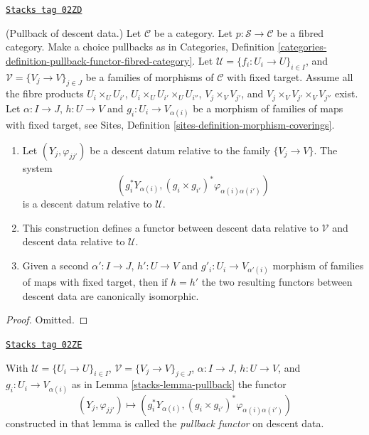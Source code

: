 \begin{lemma}[Pullback]
\label{stacks-lemma-pullback}
\href{https://stacks.math.columbia.edu/tag/02ZD}{\texttt{Stacks tag 02ZD}}

(Pullback of descent data.)
Let $\mathcal{C}$ be a category.
Let $p : \mathcal{S} \to \mathcal{C}$ be a fibred category.
Make a choice pullbacks as in Categories,
Definition \ref{categories-definition-pullback-functor-fibred-category}.
Let $\mathcal{U} = \{f_i : U_i \to U\}_{i \in I}$, and
$\mathcal{V} = \{V_j \to V\}_{j \in J}$
be a families of morphisms of $\mathcal{C}$ with fixed target.
Assume all the fibre products
$U_i \times_U U_{i'}$, $U_i \times_U U_{i'} \times_U U_{i''}$,
$V_j \times_V V_{j'}$, and $V_j \times_V V_{j'} \times_V V_{j''}$ exist.
Let $\alpha : I \to J$, $h : U \to V$ and
$g_i : U_i \to V_{\alpha(i)}$ be a morphism of families
of maps with fixed target, see
Sites, Definition \ref{sites-definition-morphism-coverings}.
\begin{enumerate}
\item Let $(Y_j, \varphi_{jj'})$ be a descent datum relative to the
family $\{V_j \to V\}$. The system
$$
\left(
g_i^*Y_{\alpha(i)},
(g_i \times g_{i'})^*\varphi_{\alpha(i)\alpha(i')}
\right)
$$
is a descent datum relative to $\mathcal{U}$.
\item This construction defines a functor between descent data relative
to $\mathcal{V}$ and descent data relative to $\mathcal{U}$.
\item Given a second $\alpha' : I \to J$, $h' : U \to V$ and
$g'_i : U_i \to V_{\alpha'(i)}$ morphism of families
of maps with fixed target, then if $h = h'$ the two resulting functors
between descent data are canonically isomorphic.
\end{enumerate}
\end{lemma}

\begin{proof}
Omitted.
\end{proof}

\begin{definition}
\label{stacks-definition-pullback-functor}
\href{https://stacks.math.columbia.edu/tag/02ZE}{\texttt{Stacks tag 02ZE}}

With $\mathcal{U} = \{U_i \to U\}_{i \in I}$,
$\mathcal{V} = \{V_j \to V\}_{j \in J}$,
$\alpha : I \to J$, $h : U \to V$,
and $g_i : U_i \to V_{\alpha(i)}$ as in Lemma \ref{stacks-lemma-pullback}
the functor
$$
(Y_j, \varphi_{jj'}) \longmapsto
(g_i^*Y_{\alpha(i)}, (g_i \times g_{i'})^*\varphi_{\alpha(i)\alpha(i')})
$$
constructed in that lemma
is called the {\it pullback functor} on descent data.
\end{definition}

